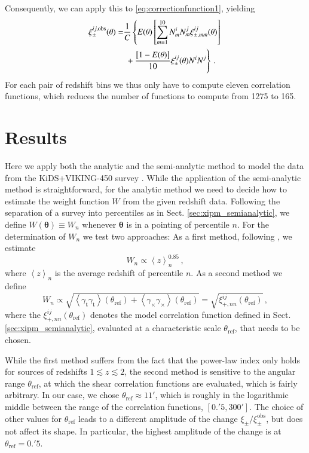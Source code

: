 \documentclass{aa}
\renewcommand{\rm}{\mathrm}
\def\b#1{\bm{#1}}
\def\la{\left<}
\def\ra{\right>}
\begin{document}
Consequently, we can apply this to \eqref{eq:correctionfunction1}, yielding
\begin{align}
\xi_{\pm}^{ij,\rm{obs}}(\theta) = & \frac{1}{C}\left\{ E(\theta)\left[\sum_{m=1}^{10} N_m^iN_m^j \xi_{\pm,mm}^{ij}(\theta)\right]\right.\nonumber\\
& \left.\vphantom{\sum_{m=1}^10}+\frac{\big[1-E(\theta)\big]}{10}\xi_\pm^{ij}(\theta)N^iN^j\right\}\, .
\label{eq:correctionfunction2}
\end{align}
For each pair of redshift bins we thus only have to compute eleven correlation functions, which reduces the number of functions to compute from 1275 to 165.


\section{Results}
\label{sec:results}
Here we apply both the analytic and the semi-analytic method to model the data from the KiDS+VIKING-450 survey \citep[KV450,][]{Wright:2018}. While the application of the semi-analytic method is straightforward, for the analytic method we need to decide how to estimate the weight function $W$ from the given redshift data. Following the separation of a survey into percentiles as in Sect. \ref{sec:xipm_semianalytic}, we define $W(\b\theta)\equiv W_n$ whenever $\b\theta$ is in a pointing of percentile $n$. For the determination of $W_n$ we test two approaches:
 As a first method, following \citet{2006APh....26...91V,1997A&A...322....1B}, we estimate 
\begin{equation}
W_n \propto \la z \ra _n^{0.85}\, ,
\end{equation}
where $\la z\ra_n$ is the average redshift of percentile $n$. As a second method we define \begin{equation}
W_n \propto \sqrt{ \la\gamma_{\rm{t}}\gamma_{\rm{t}}\ra (\theta_{\rm{ref}}) + \la \gamma_\times\gamma_\times\ra (\theta_{\rm{ref}})} = \sqrt{\xi_{+,nn}^{ij}(\theta_{\rm{ref}})}\, ,
\end{equation}
where the $\xi_{+,nn}^{ij}(\theta_{\rm{ref}})$ denotes the model correlation function defined in Sect. \ref{sec:xipm_semianalytic}, evaluated at a characteristic scale $\theta_{\rm{ref}}$, that needs to be chosen.

While the first method suffers from the fact that the power-law index only holds for sources of redshifts $1\lesssim z \lesssim 2$, the second method is sensitive to the angular range $\theta_{\rm{ref}}$, at which the shear correlation functions are evaluated, which is fairly arbitrary. In our case, we chose $\theta_{\rm{ref}}\approx 11'$, which is roughly in the logarithmic middle between the range of the correlation functions, $[0.\!'5,300']$. The choice of other values for $\theta_{\rm{ref}}$ leads to a different amplitude of the change $\xi_\pm/\xi_\pm^{\rm{obs}}$, but does not affect its shape. In particular, the highest amplitude of the change is at $\theta_{\rm{ref}}=0.\!'5$.
\end{document}
